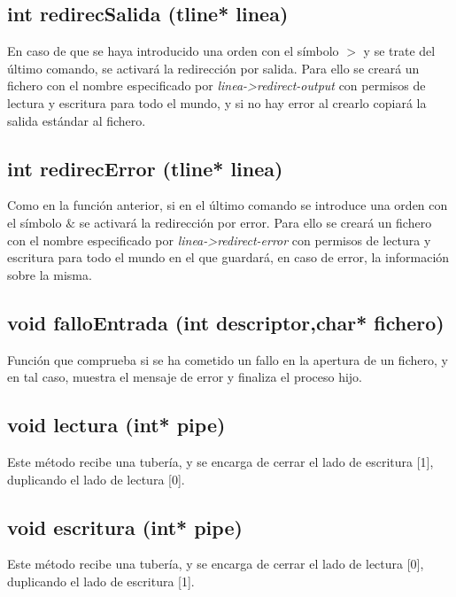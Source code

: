 \subsection{int redirecSalida (tline* linea)}
En caso de que se haya introducido una orden con el símbolo $>$ y se trate del último comando, se activará la redirección por salida. Para ello se creará un fichero con el nombre especificado por \textit{linea->redirect-output} con permisos de lectura y escritura para todo el mundo, y si no hay error al crearlo copiará la salida estándar al fichero.
\subsection{int redirecError (tline* linea)}
Como en la función anterior, si en el último comando se introduce una orden con el símbolo $\&$ se activará la redirección por error. Para ello se creará un fichero con el nombre especificado por \textit{linea->redirect-error} con permisos de lectura y escritura para todo el mundo en el que guardará, en caso de error, la información sobre la misma.
\subsection{void falloEntrada (int descriptor,char* fichero)}
Función que comprueba si se ha cometido un fallo en la apertura de un fichero, y en tal caso, muestra el mensaje de error y finaliza el proceso hijo.
\subsection{void lectura (int* pipe)}
Este método recibe una tubería, y se encarga de cerrar el lado de escritura [1], duplicando el lado de lectura [0].
\subsection{void escritura (int* pipe)}
Este método recibe una tubería, y se encarga de cerrar el lado de lectura [0], duplicando el lado de escritura [1].
\newpage
